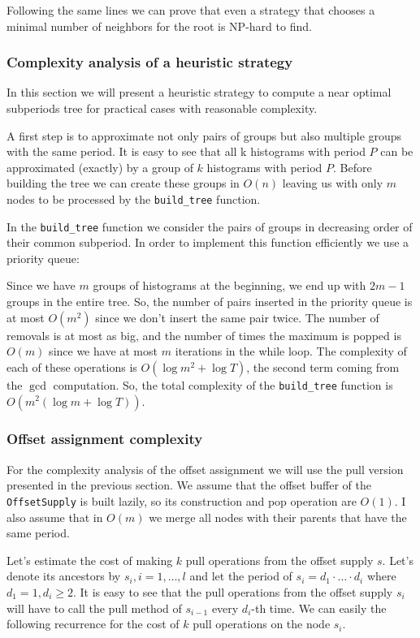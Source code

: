 Following the same lines we can prove that even a strategy that chooses a minimal number of neighbors for the root is NP-hard to find.

\subsubsection*{Complexity analysis of a heuristic strategy}

In this section we will present a heuristic strategy to compute a near optimal subperiods tree for practical cases with reasonable complexity. 

A first step is to approximate not only pairs of groups but also multiple groups with the same period. It is easy to see that all k histograms with period $P$ can be approximated (exactly) by a group of $k$ histograms with period $P$. Before building the tree we can create these groups in $O(n)$ leaving us with only $m$ nodes to be processed by the \verb+build_tree+ function. 

In the \verb+build_tree+ function we consider the pairs of groups in decreasing order of their common subperiod. In order to implement this function efficiently we use a priority queue:



Since we have $m$ groups of histograms at the beginning, we end up with $2m-1$ groups in the entire tree. So, the number of pairs inserted in the priority queue is at most $O(m^2)$ since we don’t insert the same pair twice. The number of removals is at most as big, and the number of times the maximum is popped is $O(m)$ since we have at most $m$ iterations in the while loop. The complexity of each of these operations is $O(\log m^2+\log T)$, the second term coming from the $\gcd$ computation. So, the total complexity of the \verb+build_tree+ function is $O(m^2(\log m + \log T))$. 

\subsubsection*{Offset assignment complexity}

For the complexity analysis of the offset assignment we will use the pull version presented in the previous section. We assume that the offset buffer of the \verb+OffsetSupply+ is built lazily, so its construction and pop operation are $O(1)$. I also assume that in $O(m)$ we merge all nodes with their parents that have the same period.

Let’s estimate the cost of making $k$ pull operations from the offset supply $s$. Let's denote its ancestors by $s_i,i=1,\ldots,l$ and let the period of $s_i=d_1\cdot\ldots\cdot d_i$ where $d_1=1, d_i \geq 2$. It is easy to see that the pull operations from the offset supply $s_i$ will have to call the pull method of $s_{i-1}$ every $d_i$-th time. We can easily the following recurrence for the cost of $k$ pull operations on the node $s_i$.

